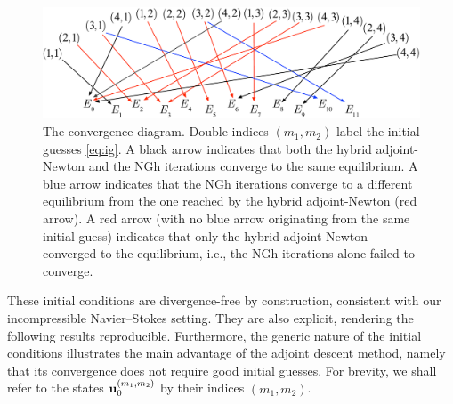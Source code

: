 \documentclass{jfm}
\begin{document}
\begin{figure}
\centering
\includegraphics[width=\textwidth]{conv_diagram}
\caption{
The convergence diagram. Double indices $(m_1,m_2)$ label the initial guesses
\eqref{eq:ig}.
A black arrow indicates that both the hybrid adjoint-Newton and the NGh
iterations converge to the same equilibrium.
A blue arrow indicates that the NGh iterations converge to a different
equilibrium from the one reached by the hybrid adjoint-Newton (red
arrow).
A red arrow (with no blue arrow originating from the same initial guess)
indicates that only the hybrid adjoint-Newton converged to the equilibrium,
i.e., the NGh iterations alone failed to converge.
        }
\label{fig:EQ_diag}
\end{figure}

These initial conditions are divergence-free by construction, consistent with our incompressible
Navier--Stokes setting. They are also explicit, rendering the following results
reproducible. Furthermore, the generic nature of the initial conditions illustrates the main
advantage of the adjoint descent method, namely that its convergence does not require
good initial guesses.
For brevity, we shall refer to the states $\mathbf u_0^{(m_1,m_2)}$ by their
indices $(m_1,m_2)$.
\end{document}
